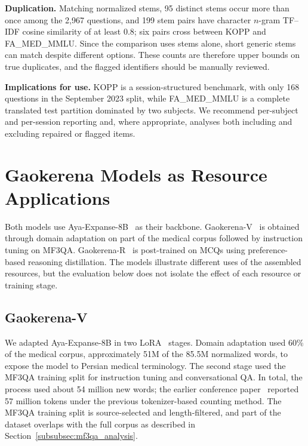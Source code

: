 \documentclass[manuscript,screen,review]{acmart}
\begin{document}
\textbf{Duplication.} Matching normalized stems, 95 distinct stems occur more than once among the 2,967 questions, and 199 stem pairs have character $n$-gram TF--IDF cosine similarity of at least 0.8; six pairs cross between KOPP and FA\_MED\_MMLU. Since the comparison uses stems alone, short generic stems can match despite different options. These counts are therefore upper bounds on true duplicates, and the flagged identifiers should be manually reviewed.

\textbf{Implications for use.} KOPP is a session-structured benchmark, with only 168 questions in the September 2023 split, while FA\_MED\_MMLU is a complete translated test partition dominated by two subjects. We recommend per-subject and per-session reporting and, where appropriate, analyses both including and excluding repaired or flagged items.

\section{Gaokerena Models as Resource Applications}\label{sec4}

Both models use Aya-Expanse-8B~\cite{b12,b13} as their backbone. Gaokerena-V~\cite{b1} is obtained through domain adaptation on part of the medical corpus followed by instruction tuning on MF3QA. Gaokerena-R~\cite{b2} is post-trained on MCQs using preference-based reasoning distillation. The models illustrate different uses of the assembled resources, but the evaluation below does not isolate the effect of each resource or training stage.

\subsection{Gaokerena-V}\label{subsec4.1}

We adapted Aya-Expanse-8B in two LoRA~\cite{b31} stages. Domain adaptation used 60\% of the medical corpus, approximately 51M of the 85.5M normalized words, to expose the model to Persian medical terminology. The second stage used the MF3QA training split for instruction tuning and conversational QA. In total, the process used about 54 million new words; the earlier conference paper~\cite{b1} reported 57 million tokens under the previous tokenizer-based counting method. The MF3QA training split is source-selected and length-filtered, and part of the dataset overlaps with the full corpus as described in Section~\ref{subsubsec:mf3qa_analysis}.
\end{document}
